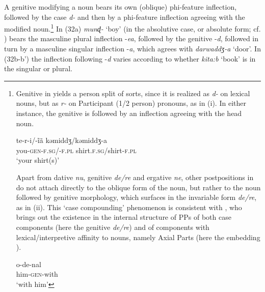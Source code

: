 \documentclass[output=paper]{langsci/langscibook}
\begin{document}
A genitive modifying a noun bears its own (oblique) phi-feature inflection, followed by the case  \textit{d-} and then by a phi-feature inflection agreeing with the modified noun.\footnote{Genitive in  yields a person split of sorts, since it is realized as \textit{d-} on lexical nouns, but as \textit{r-} on Participant (1\slash 2 person) pronouns, as in (i). In either instance, the genitive  is followed by an inflection agreeing with the head noun.

\ea \gll    te-r-i/-ĩã  kəmiddʒ/kəmiddʒ-a\\
            you-\textsc{gen-f.sg/-f.pl}
            shirt.\textsc{f.sg}/shirt-\textsc{f.pl}\\
    \glt    ‘your shirt(s)’
\z

Apart from dative \textit{nu}, genitive \textit{de\slash re} and ergative \textit{ne}, other postpositions in  do not attach directly to the oblique form of the noun, but rather to the noun followed by genitive morphology, which surfaces in the invariable form \textit{de\slash re}, as in (ii). This ‘case compounding’ phenomenon is consistent with \citet{Svenonius2006}, who brings out the existence in the internal structure of PPs of both case components (here the genitive \textit{de\slash re}) and of components with lexical\slash interpretive affinity to nouns, namely Axial Parts (here the embedding ).

\ea \gll    o-de-nal\\
            him-\textsc{gen}-with\\
    \glt    ‘with him’
\z
}
In (32a) \textit{munɖ-} ‘boy’ (in the absolutive case, or absolute form; cf. \citealt{Bailey1904}) bears the masculine plural inflection -\textit{ea}, followed by the genitive -\textit{d}, followed in turn by a masculine singular inflection -\textit{a}, which agrees with \textit{darwaddʒ-a} ‘door’. In (32b-b’) the inflection following -\textit{d} varies according to whether \textit{kita:b} ‘book’ is in the singular or plural. 
\end{document}
